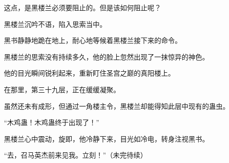 \begin{this_body}
这点，是黑楼兰必须要阻止的。但是该如何阻止呢？

黑楼兰沉吟不语，陷入思索当中。

黑书静静地跪在地上，耐心地等候着黑楼兰接下来的命令。

黑楼兰的思索没有持续多久，他的脸上忽然出现了一抹惊异的神色。

他的目光瞬间锐利起来，重新盯住圣宫之巅的真阳楼上。

在那里，第三十九层，正在缓缓凝聚。

虽然还未有成形，但通过一角楼主令，黑楼兰却能得知此层中现有的蛊虫。

“木鸡蛊！木鸡蛊终于出现了！”

黑楼兰心中震动，旋即，他冷静下来，目光如冷电，转身注视黑书。

“去，召马英杰前来见我。立刻！”（未完待续）

\end{this_body}

